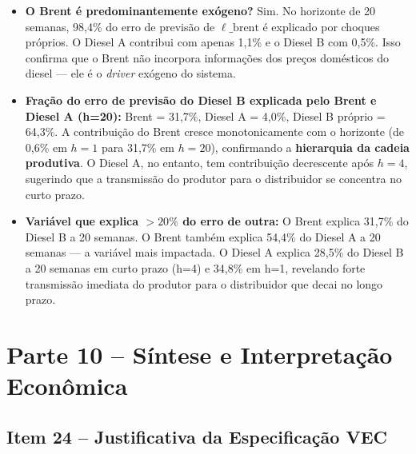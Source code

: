 \documentclass[12pt,a4paper]{article}
\begin{document}
\begin{itemize}
  \item \textbf{O Brent é predominantemente exógeno?} Sim.
        No horizonte de 20 semanas, 98,4\% do erro de previsão de
        $\ell\_\text{brent}$ é explicado por choques próprios.
        O Diesel A contribui com apenas 1,1\% e o Diesel B com 0,5\%.
        Isso confirma que o Brent não incorpora informações dos preços
        domésticos do diesel --- ele é o \emph{driver} exógeno do sistema.

  \item \textbf{Fração do erro de previsão do Diesel B explicada pelo Brent e
        Diesel A (h=20):}
        Brent = 31,7\%, Diesel A = 4,0\%, Diesel B próprio = 64,3\%.
        A contribuição do Brent cresce monotonicamente com o horizonte
        (de 0,6\% em $h=1$ para 31,7\% em $h=20$), confirmando a
        \textbf{hierarquia da cadeia produtiva}.
        O Diesel A, no entanto, tem contribuição decrescente após $h=4$,
        sugerindo que a transmissão do produtor para o distribuidor
        se concentra no curto prazo.

  \item \textbf{Variável que explica $> 20\%$ do erro de outra:}
        O Brent explica 31,7\% do Diesel B a 20 semanas.
        O Brent também explica 54,4\% do Diesel A a 20 semanas ---
        a variável mais impactada.
        O Diesel A explica 28,5\% do Diesel B a 20 semanas em curto prazo
        (h=4) e 34,8\% em h=1, revelando forte transmissão imediata
        do produtor para o distribuidor que decai no longo prazo.
\end{itemize}

\section{Parte 10 -- Síntese e Interpretação Econômica}

\subsection{Item 24 -- Justificativa da Especificação VEC}
\end{document}
